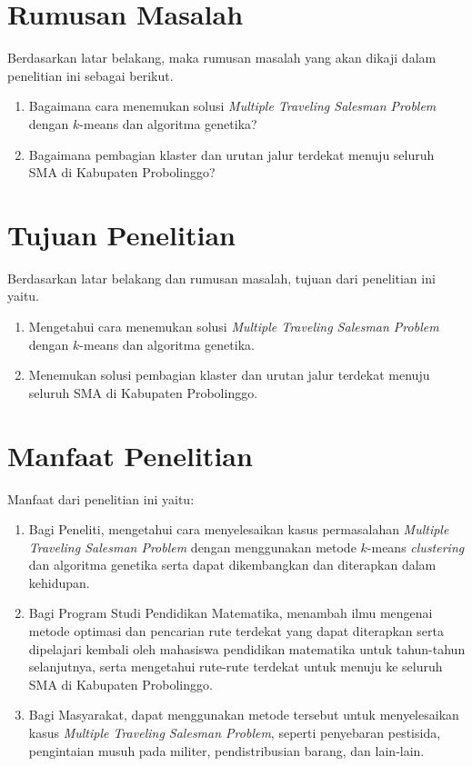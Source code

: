 \section{Rumusan Masalah}

Berdasarkan latar belakang, maka rumusan masalah yang akan dikaji dalam penelitian ini sebagai berikut.
\begin{enumerate}
    \item Bagaimana cara menemukan solusi \textit{Multiple Traveling Salesman Problem} dengan $k$-means dan algoritma genetika?
    \item Bagaimana pembagian klaster dan urutan jalur terdekat menuju seluruh SMA di Kabupaten Probolinggo?
\end{enumerate}

\section{Tujuan Penelitian}

Berdasarkan latar belakang dan rumusan masalah, tujuan dari penelitian ini yaitu.
\begin{enumerate}
	\item Mengetahui cara menemukan solusi \textit{Multiple Traveling Salesman Problem} dengan $k$-means dan algoritma genetika.
	\item Menemukan solusi pembagian klaster dan urutan jalur terdekat menuju seluruh SMA di Kabupaten Probolinggo.
\end{enumerate}

\section{Manfaat Penelitian}

Manfaat dari penelitian ini yaitu:
\begin{enumerate}
	\item Bagi Peneliti, mengetahui cara menyelesaikan kasus permasalahan \textit{Multiple Traveling Salesman Problem} dengan menggunakan metode $k$-means \textit{clustering} dan algoritma genetika serta dapat dikembangkan dan diterapkan dalam kehidupan.

	\item Bagi Program Studi Pendidikan Matematika, menambah ilmu mengenai metode optimasi dan pencarian rute terdekat yang dapat diterapkan serta dipelajari kembali oleh mahasiswa pendidikan matematika untuk tahun-tahun selanjutnya, serta mengetahui rute-rute terdekat untuk menuju ke seluruh SMA di Kabupaten Probolinggo.
	
	\item Bagi Masyarakat, dapat menggunakan metode tersebut untuk menyelesaikan kasus \textit{Multiple Traveling Salesman Problem}, seperti penyebaran pestisida, pengintaian musuh pada militer, pendistribusian barang, dan lain-lain.
	
\end{enumerate}


